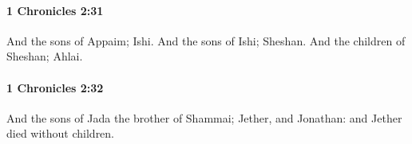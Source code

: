 		\paragraph{1 Chronicles 2:31} %
			\label{1CHRONICLES-2-31}

			And the sons of Appaim; Ishi. And the sons of Ishi; Sheshan. And the children of Sheshan; Ahlai.


		\paragraph{1 Chronicles 2:32} %
			\label{1CHRONICLES-2-32}

			And the sons of Jada the brother of Shammai; Jether, and Jonathan: and Jether died without children.


